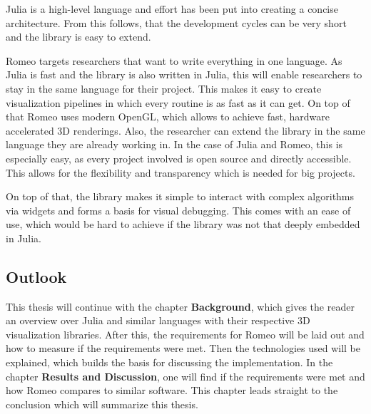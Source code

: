 Julia is a high-level language and effort has been put into creating a concise architecture. From this follows, that the development cycles can be very short and the library is easy to extend.

Romeo targets researchers that want to write everything in one language.
As Julia is fast and the library is also written in Julia, this will enable researchers to stay in the same language for their project. 
This makes it easy to create visualization pipelines in which every routine is as fast as it can get. 
On top of that Romeo uses modern OpenGL, which allows to achieve fast, hardware accelerated 3D renderings.
Also, the researcher can extend the library in the same language they are already working in. 
In the case of Julia and Romeo, this is especially easy, as every project involved is open source and directly accessible.
This allows for the flexibility and transparency which is needed for big projects.

On top of that, the library makes it simple to interact with complex algorithms via widgets and forms a basis for visual debugging. 
This comes with an ease of use, which would be hard to achieve if the library was not that deeply embedded in Julia.


\subsection{Outlook}
This thesis will continue with the chapter \textbf{Background}, which gives the reader an overview over Julia and similar languages with their respective 3D visualization libraries.
After this, the requirements for Romeo will be laid out and how to measure if the requirements were met.
Then the technologies used will be explained, which builds the basis for discussing the implementation.
In the chapter \textbf{Results and Discussion}, one will find if the requirements were met and how Romeo compares to similar software.
This chapter leads straight to the conclusion which will summarize this thesis.
